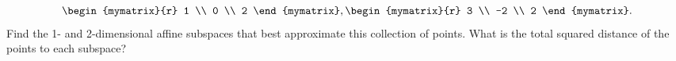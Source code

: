 \begin{ex}
\begin{equation*}
{      \begin{mymatrix}{r} 1 \\ 0 \\ 2 \end{mymatrix},
      \begin{mymatrix}{r} 3 \\ -2 \\ 2 \end{mymatrix}
    }.
  \end{equation*}
  Find the 1- and 2-dimensional affine subspaces that best approximate
  this collection of points. What is the total squared
  distance of the points to each subspace?
\end{ex}
